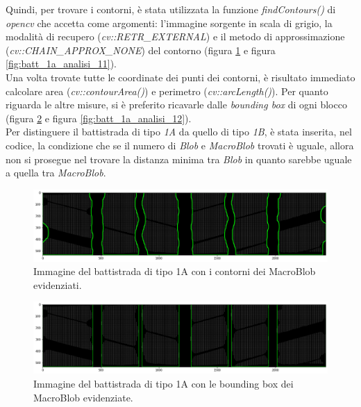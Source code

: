 \noindent Quindi, per trovare i contorni, è stata utilizzata la funzione \textit{findContours()} di \textit{opencv} che accetta come argomenti: l'immagine sorgente in scala di grigio, la modalità di recupero (\textit{cv::RETR\_EXTERNAL}) e il metodo di approssimazione (\textit{cv::CHAIN\_APPROX\_NONE}) del contorno (figura \ref{fig:batt_1a_analisi_9} e figura \ref{fig:batt_1a_analisi_11}).\\
\newline
Una volta trovate tutte le coordinate dei punti dei contorni, è risultato immediato calcolare area (\textit{cv::contourArea()}) e perimetro (\textit{cv::arcLength()}). Per quanto riguarda le altre misure, si è preferito ricavarle dalle \textit{bounding box} di ogni blocco (figura \ref{fig:batt_1a_analisi_10} e figura \ref{fig:batt_1a_analisi_12}).\\
\newline
Per distinguere il battistrada di tipo \textit{1A} da quello di tipo \textit{1B}, è stata inserita, nel codice, la condizione che se il numero di \textit{Blob} e \textit{MacroBlob} trovati è uguale, allora non si prosegue nel trovare la distanza minima tra \textit{Blob} in quanto sarebbe uguale a quella tra \textit{MacroBlob}.

\begin{figure}[H]
	\centering
	\includegraphics[width=0.9\columnwidth]{./pictures/batt_1a_analisi_9.png}
	\caption{Immagine del battistrada di tipo 1A con i contorni dei MacroBlob evidenziati.}\label{fig:batt_1a_analisi_9}
\end{figure}

\begin{figure}[H]
	\centering
	\includegraphics[width=0.9\columnwidth]{./pictures/batt_1a_analisi_10.png}
	\caption{Immagine del battistrada di tipo 1A con le bounding box dei MacroBlob evidenziate.}\label{fig:batt_1a_analisi_10}
\end{figure}

